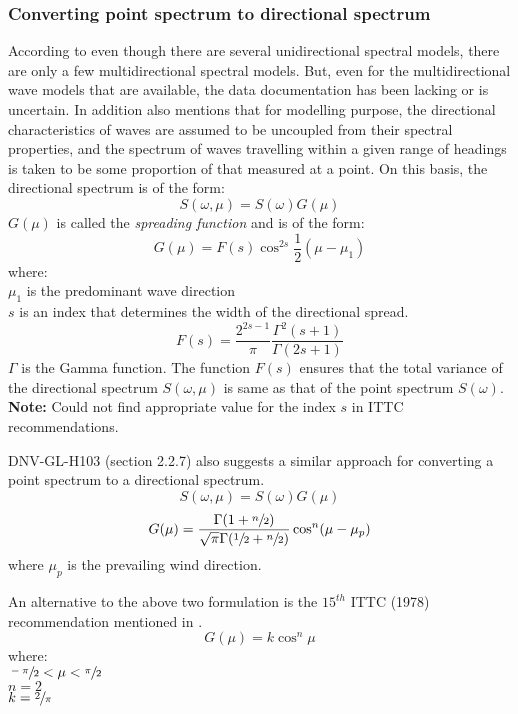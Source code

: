 \subsubsection{Converting point spectrum to directional spectrum}
\label{Converting point spectrum to directional spectrum}
According to \cite{stansberg2002specialist} even though there are several
unidirectional spectral models, there are only a few multidirectional spectral
models. But, even for the multidirectional wave models that are available, the 
data documentation has been lacking or is uncertain. In addition
\cite{stansberg2002specialist} also mentions that for modelling purpose, the
directional characteristics of waves are assumed to be uncoupled from their
spectral properties, and the spectrum of waves travelling within a given range
of headings is taken to be some proportion of that measured at a point. On this
basis, the directional spectrum is of the form:
\begin{equation}
  S(\omega, \mu) = S(\omega) G(\mu)
\end{equation}
$G(\mu)$ is called the \textit{spreading function} and is of the form:
\begin{equation}
  G(\mu) = F(s) \cos^{2s} \frac{1}{2} (\mu - \mu_1)
\end{equation}
where:\\ 
$\mu_1$ is the predominant wave direction  \\
$s$ is an index that determines the width of the directional spread.
\begin{equation}
  F(s) = \frac{2^{2s - 1}}{\pi} \frac{\Gamma^2 (s+1)}{\Gamma (2s + 1)}
\end{equation}
$\Gamma$ is the Gamma function. The function $F(s)$ ensures that the total
variance of the directional spectrum $S(\omega, \mu)$ is same as that of the
point spectrum $S(\omega)$.\\
\textbf{Note:} Could not find appropriate value for the index $s$ in ITTC 
recommendations.


DNV-GL-H103 \cite{dnv2014recommended} (section 2.2.7) also suggests a similar
approach for converting a point spectrum to a directional spectrum. 
\begin{equation}
  S(\omega, \mu) = S(\omega) G(\mu)
\end{equation}
\begin{equation}
  G(\mu) = \frac{\Gamma(1 + \sfrac{n}{2})}
                {\sqrt{\pi} \Gamma(\sfrac{1}{2} + \sfrac{n}{2})}
           \cos^n (\mu - \mu_p)
\end{equation}
where $\mu_p$ is the prevailing wind direction.

An alternative to the above two formulation is the $15^{th}$ ITTC (1978) 
recommendation mentioned in \cite{lewis1988principles}.
\begin{equation}
  G(\mu) = k \cos^n \mu
\end{equation}
where: \\ 
$\sfrac{-\pi}{2} < \mu < \sfrac{\pi}{2}$\\ 
$n = 2$ \\
$k = \sfrac{2}{\pi}$



